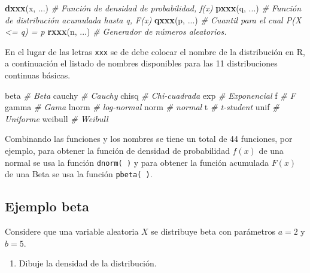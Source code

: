 \documentclass[10pt,]{krantz}
\makeatletter
\newenvironment{Shaded}{\begin{snugshade}}{\end{snugshade}}
\newcommand{\KeywordTok}[1]{\textcolor[rgb]{0.13,0.29,0.53}{\textbf{#1}}}
\newcommand{\CommentTok}[1]{\textcolor[rgb]{0.56,0.35,0.01}{\textit{#1}}}
\newcommand{\NormalTok}[1]{#1}
\providecommand{\tightlist}{%
  \setlength{\itemsep}{0pt}\setlength{\parskip}{0pt}}
\newenvironment{kframe}{%
\medskip{}
\setlength{\fboxsep}{.8em}
 \def\at@end@of@kframe{}%
 \ifinner\ifhmode%
  \def\at@end@of@kframe{\end{minipage}}%
  \begin{minipage}{\columnwidth}%
 \fi\fi%
 \def\FrameCommand##1{\hskip\@totalleftmargin \hskip-\fboxsep
 \colorbox{shadecolor}{##1}\hskip-\fboxsep
     \hskip-\linewidth \hskip-\@totalleftmargin \hskip\columnwidth}%
 \MakeFramed {\advance\hsize-\width
   \@totalleftmargin\z@ \linewidth\hsize
   \@setminipage}}%
 {\par\unskip\endMakeFramed%
 \at@end@of@kframe}
\renewenvironment{Shaded}{\begin{kframe}}{\end{kframe}}
\makeatother
\begin{document}
\begin{Shaded}
\begin{Highlighting}[]
\KeywordTok{dxxx}\NormalTok{(x, ...)  }\CommentTok{# Función de densidad de probabilidad, f(x)}
\KeywordTok{pxxx}\NormalTok{(q, ...)  }\CommentTok{# Función de distribución acumulada hasta q, F(x)}
\KeywordTok{qxxx}\NormalTok{(p, ...)  }\CommentTok{# Cuantil para el cual P(X <= q) = p}
\KeywordTok{rxxx}\NormalTok{(n, ...)  }\CommentTok{# Generador de números aleatorios.}
\end{Highlighting}
\end{Shaded}

En el lugar de las letras \texttt{xxx} se de debe colocar el nombre de
la distribución en R, a continuación el listado de nombres disponibles
para las 11 distribuciones continuas básicas.

\begin{Shaded}
\begin{Highlighting}[]
\NormalTok{beta     }\CommentTok{# Beta}
\NormalTok{cauchy   }\CommentTok{# Cauchy}
\NormalTok{chisq    }\CommentTok{# Chi-cuadrada}
\NormalTok{exp      }\CommentTok{# Exponencial}
\NormalTok{f        }\CommentTok{# F}
\NormalTok{gamma    }\CommentTok{# Gama}
\NormalTok{lnorm    }\CommentTok{# log-normal}
\NormalTok{norm     }\CommentTok{# normal}
\NormalTok{t        }\CommentTok{# t-student}
\NormalTok{unif     }\CommentTok{# Uniforme}
\NormalTok{weibull  }\CommentTok{# Weibull}
\end{Highlighting}
\end{Shaded}

Combinando las funciones y los nombres se tiene un total de 44
funciones, por ejemplo, para obtener la función de densidad de
probabilidad \(f(x)\) de una normal se usa la función \texttt{dnorm(\ )}
y para obtener la función acumulada \(F(x)\) de una Beta se usa la
función \texttt{pbeta(\ )}.

\subsection*{Ejemplo beta}\label{ejemplo-beta}


Considere que una variable aleatoria \(X\) se distribuye beta con
parámetros \(a=2\) y \(b=5\).

\begin{enumerate}
\def\labelenumi{\arabic{enumi})}
\tightlist
\item
  Dibuje la densidad de la distribución.
\end{enumerate}
\end{document}
